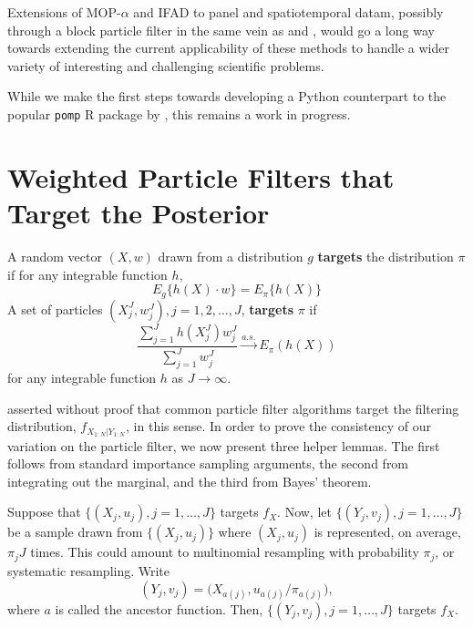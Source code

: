 \documentclass{article}
\begin{document}
Extensions of MOP-$\alpha$ and IFAD to panel and spatiotemporal datam, possibly through a block particle filter in the same vein as \cite{ionides22} and \cite{ning23}, would go a long way towards extending the current applicability of these methods to handle a wider variety of interesting and challenging scientific problems. 

While we make the first steps towards developing a Python counterpart to the popular \texttt{pomp} R package by \citet{king16, king2017pompmanual}, this remains a work in progress. 





\appendix
\renewcommand{\thefigure}{A\arabic{figure}}
\setcounter{figure}{0}

\section{Weighted Particle Filters that Target the Posterior}


\begin{defn}[Targeting]
    A random vector $(X, w)$ drawn from a distribution $g$ \textbf{targets} the distribution $\pi$ if for any integrable function $h$,
\begin{equation}
    E_g\{h(X) \cdot w\}=E_\pi\{h(X)\}
\end{equation}  
    A set of particles $(X^J_j, w^J_j), j=1,2, \ldots,J$, \textbf{targets} $\pi$ if
\begin{equation}
    \frac{\sum_{j=1}^J h(X^J_j) w^J_j}{\sum_{j=1}^J w^J_j} \stackrel{a.s.}{\to} E_\pi(h(X))
\end{equation}
for any integrable function $h$ as $J \to \infty$.
\end{defn}
\citet{chopin2004clt} asserted without proof that common particle filter algorithms target the filtering distribution, $f_{X_{1:N}|Y_{1:N}}$, in this sense.
In order to prove the consistency of our variation on the particle filter, we now present three helper lemmas.
The first follows from standard importance sampling arguments, the second from integrating out the marginal, and the third from Bayes' theorem. 

\begin{lem}
    \label{lem:change-measure-proper-weights}
    Suppose that $\{(X_j,u_j),j=1,\dots,J\}$ targets $f_X$. Now, let $\{(Y_j,v_j),j=1,\dots,J\}$ be a sample drawn from $\{(X_j,u_j)\}$ where $(X_j,u_j)$ is represented, on average, $\pi_j J$ times. This could amount to multinomial resampling with probability $\pi_j$, or systematic resampling. Write
    \[
    (Y_j,v_j) = \big(X_{a(j)},u_{a(j)}/\pi_{a(j)}\big),
    \]
    where $a$ is called the ancestor function. Then, $\{(Y_j,v_j),j=1,\dots,J\}$ targets $f_X$.
\end{lem}
\end{document}
